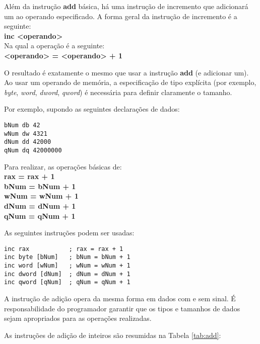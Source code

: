 Além da instrução \textbf{add} básica, há uma instrução de incremento que adicionará um ao operando especificado. A forma geral da instrução de incremento é a seguinte:\\
\textbf{inc <operando>}\\
Na qual a operação é a seguinte:\\
\textbf{<operando> = <operando> + 1}

O resultado é exatamente o mesmo que usar a instrução \textbf{add} (e adicionar um). Ao usar um operando de memória, a especificação de tipo explícita (por exemplo, \textit{byte}, \textit{word}, \textit{dword}, \textit{qword}) é necessária para definir claramente o tamanho.

Por exemplo, supondo as seguintes declarações de dados:
\begin{lstlisting}
bNum db 42
wNum dw 4321
dNum dd 42000
qNum dq 42000000
\end{lstlisting}

Para realizar, as operações básicas de:\\
\textbf{rax = rax + 1\\
bNum = bNum + 1\\
wNum = wNum + 1\\
dNum = dNum + 1\\
qNum = qNum + 1\\}

As seguintes instruções podem ser usadas:
\begin{lstlisting}
inc rax           ; rax = rax + 1
inc byte [bNum]   ; bNum = bNum + 1
inc word [wNum]   ; wNum = wNum + 1
inc dword [dNum]  ; dNum = dNum + 1
inc qword [qNum]  ; qNum = qNum + 1
\end{lstlisting}

A instrução de adição opera da mesma forma em dados com e sem sinal. É responsabilidade do programador garantir que os tipos e tamanhos de dados sejam apropriados para as operações realizadas.

As instruções de adição de inteiros são resumidas na Tabela \ref{tab:add}:

